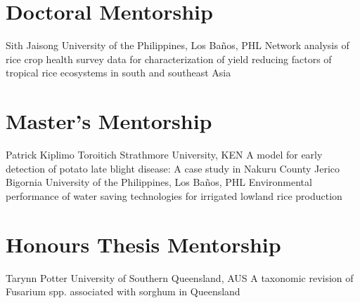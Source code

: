 \section*{Doctoral Mentorship}
\begin{entrylist}
    {Sith Jaisong {}}
    {University of the Philippines, Los Ba\~nos, PHL}
    {Network analysis of rice crop health survey data for characterization of yield reducing factors of tropical rice ecosystems in south and southeast Asia}
\end{entrylist}

\section*{Master's Mentorship}
\begin{entrylist}
    {Patrick Kiplimo Toroitich {}}
    {Strathmore University, KEN}
    {A model for early detection of potato late blight disease: A case study in Nakuru County}
    {Jerico Bigornia {}}
    {University of the Philippines, Los Ba\~nos, PHL}
    {Environmental performance of water saving technologies for irrigated lowland rice production}
\end{entrylist}

\section*{Honours Thesis Mentorship}
\begin{entrylist}
    {Tarynn Potter {}}
    {University of Southern Queensland, AUS}
    {A taxonomic revision of Fusarium spp. associated with sorghum in Queensland}
\end{entrylist}
